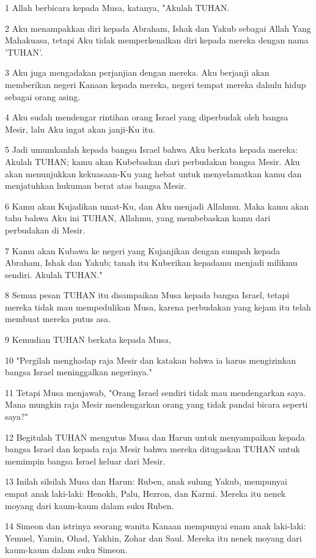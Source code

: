 \par 1 Allah berbicara kepada Musa, katanya, "Akulah TUHAN.
\par 2 Aku menampakkan diri kepada Abraham, Ishak dan Yakub sebagai Allah Yang Mahakuasa, tetapi Aku tidak memperkenalkan diri kepada mereka dengan nama 'TUHAN'.
\par 3 Aku juga mengadakan perjanjian dengan mereka. Aku berjanji akan memberikan negeri Kanaan kepada mereka, negeri tempat mereka dahulu hidup sebagai orang asing.
\par 4 Aku sudah mendengar rintihan orang Israel yang diperbudak oleh bangsa Mesir, lalu Aku ingat akan janji-Ku itu.
\par 5 Jadi umumkanlah kepada bangsa Israel bahwa Aku berkata kepada mereka: Akulah TUHAN; kamu akan Kubebaskan dari perbudakan bangsa Mesir. Aku akan menunjukkan kekuasaan-Ku yang hebat untuk menyelamatkan kamu dan menjatuhkan hukuman berat atas bangsa Mesir.
\par 6 Kamu akan Kujadikan umat-Ku, dan Aku menjadi Allahmu. Maka kamu akan tahu bahwa Aku ini TUHAN, Allahmu, yang membebaskan kamu dari perbudakan di Mesir.
\par 7 Kamu akan Kubawa ke negeri yang Kujanjikan dengan sumpah kepada Abraham, Ishak dan Yakub; tanah itu Kuberikan kepadamu menjadi milikmu sendiri. Akulah TUHAN."
\par 8 Semua pesan TUHAN itu disampaikan Musa kepada bangsa Israel, tetapi mereka tidak mau mempedulikan Musa, karena perbudakan yang kejam itu telah membuat mereka putus asa.
\par 9 Kemudian TUHAN berkata kepada Musa,
\par 10 "Pergilah menghadap raja Mesir dan katakan bahwa ia harus mengizinkan bangsa Israel meninggalkan negerinya."
\par 11 Tetapi Musa menjawab, "Orang Israel sendiri tidak mau mendengarkan saya. Mana mungkin raja Mesir mendengarkan orang yang tidak pandai bicara seperti saya?"
\par 12 Begitulah TUHAN mengutus Musa dan Harun untuk menyampaikan kepada bangsa Israel dan kepada raja Mesir bahwa mereka ditugaskan TUHAN untuk memimpin bangsa Israel keluar dari Mesir.
\par 13 Inilah silsilah Musa dan Harun: Ruben, anak sulung Yakub, mempunyai empat anak laki-laki: Henokh, Palu, Hezron, dan Karmi. Mereka itu nenek moyang dari kaum-kaum dalam suku Ruben.
\par 14 Simeon dan istrinya seorang wanita Kanaan mempunyai enam anak laki-laki: Yemuel, Yamin, Ohad, Yakhin, Zohar dan Saul. Mereka itu nenek moyang dari kaum-kaum dalam suku Simeon.

